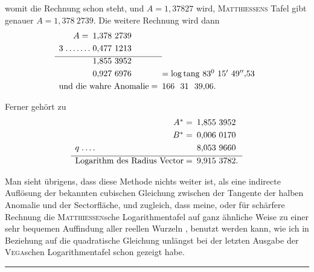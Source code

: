 womit die Rechnung schon steht, und \(A=1{,}37827\) wird, \textsc{Matthiessens} Tafel gibt genauer \(A=1{,}378\ 2739.\) Die weitere Rechnung wird dann
\[
\begin{array}{r@{\;}l@{\;}l@{\quad}l}
\multicolumn{2}{r}{A=}&1{,}378\ 2739&\\[3pt]
3&.\,.\,.\,.\,.\,.\,.&0{,}477\ 1213&\\[3pt]\cline{1-3}
&&1{,}855\ 3952&\\[3pt]
&&0{,}927\ 6976&=\log\mathrm{tang}\ 83^0\ 15'\ 49''{,}53\\[3pt]
\multicolumn{3}{r}{\text{und die wahre Anomalie}=}&166\ \ 31\ \ 39{,}06.
\end{array}
\]
\par
\noindent\hspace*{\parindent}Ferner gehört zu
\[
\begin{array}{r@{\;}l@{\;}l}
\multicolumn{2}{r}{A^*=}&1{,}855\ 3952\\[3pt]
\multicolumn{2}{r}{B^*=}&0{,}006\ 0170\\[3pt]
q&.\,.\,.\,.&8{,}053\ 9660\\[3pt]\hline
\multicolumn{2}{r}{\text{Logarithm des Radius Vector}=}&9{,}915\ 3782.
\end{array}
\]
\par
\noindent\hspace*{\parindent}Man sieht übrigens, dass diese Methode nichts weiter ist, als eine indirecte Auflösung der bekannten cubischen Gleichung zwischen der Tangente der halben Anomalie und der Sectorfläche, und zugleich, dass meine, oder für schärfere Rechnung die \textsc{Matthiessen}sche Logarithmentafel auf ganz ähnliche Weise zu einer sehr bequemen Auffindung aller reellen Wurzeln , benutzt werden kann, wie ich in Beziehung auf die quadratische Gleichung unlängst bei der letzten Ausgabe der \textsc{Vega}schen Logarithmentafel schon gezeigt habe.
\par\medskip
\begin{center}\rule{.2\linewidth}{.4pt}\end{center}
